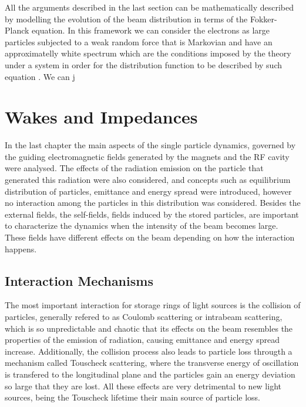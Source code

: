 \documentclass[
	12pt,				%
	openright,			%
	oneside,			%
	a4paper,		%
	chapter=TITLE,		%
	section=TITLE,		%
    brazil,				%
	english,			%
	sumario=tradicional,
	]{abntex2}
\begin{document}
	All the arguments described in the last section can be mathematically described by modelling the evolution of the beam distribution in terms of the Fokker-Planck equation. In this framework we can consider the electrons as large particles subjected to a weak random force that is Markovian and have an approximatelly white spectrum which are the conditions imposed by the theory under a system in order for the distribution function to be described by such equation \cite{landau, Wang1945, zwanzig}. We can j



\chapter{Wakes and Impedances}\label{cap:wake_impedances}

In the last chapter the main aspects of the single particle dynamics, governed by the guiding electromagnetic fields generated by the magnets and the RF cavity were analysed. The effects of the radiation emission on the particle that generated this radiation were also considered, and concepts such as equilibrium distribution of particles, emittance and energy spread were introduced, however no interaction among the particles in this distribution was considered. Besides the external fields, the self-fields, fields induced by the stored particles, are important to characterize the dynamics when the intensity of the beam becomes large. These fields have different effects on the beam depending on how the interaction happens.

  \section{Interaction Mechanisms}

  The most important interaction for storage rings of light sources is the collision of particles, generally refered to as Coulomb scattering or intrabeam scattering, which is so unpredictable and chaotic that its effects on the beam resembles the properties of the emission of radiation, causing emittance and energy spread increase. Additionally, the collision process also leads to particle loss througth a mechanism called Touscheck scattering, where the transverse energy of oscillation is transfered to the longitudinal plane and the particles gain an energy deviation so large that they are lost. All these effects are very detrimental to new light sources, being the Touscheck lifetime their main source of particle loss.
\end{document}
